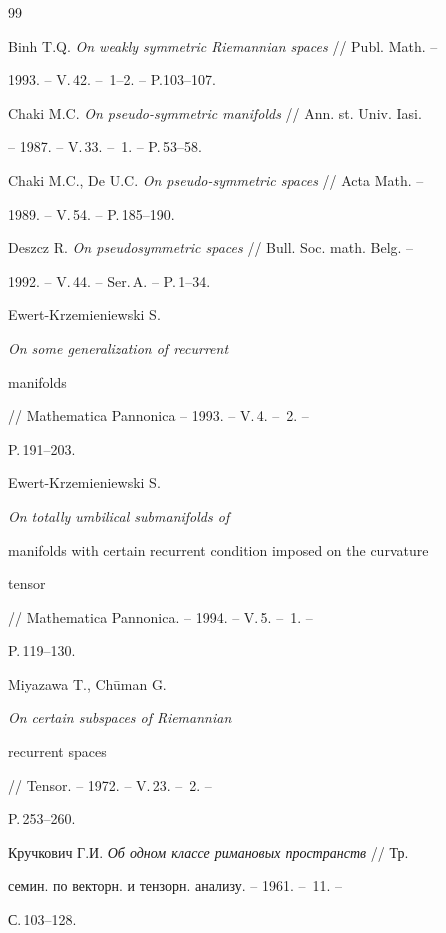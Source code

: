 \begin{thebibliography}{99}







Binh T.Q. {\em On weakly symmetric Riemannian spaces} // Publ. Math. --


1993. -- V.\,42. -- \No\,1--2. -- P.103--107.




Chaki M.C. {\em On pseudo-symmetric manifolds} // Ann. st. Univ. Iasi.


-- 1987. -- V.\,33. -- \No\,1. -- P.\,53--58.




Chaki M.C., De U.C. {\em On pseudo-symmetric spaces} // Acta Math. --


1989. -- V.\,54. -- P.\,185--190.




Deszcz R. {\em On pseudosymmetric spaces} // Bull. Soc. math. Belg. --


1992. -- V.\,44. -- Ser.\,A. -- P.\,1--34.




Ewert-Krzemieniewski S. {\em On some generalization of recurrent


manifolds} // Mathematica Pannonica -- 1993. -- V.\,4. -- \No\,2. --


P.\,191--203.




Ewert-Krzemieniewski S. {\em On totally umbilical submanifolds of


manifolds with certain recurrent condition imposed on the curvature


tensor} // Mathematica Pannonica. -- 1994. -- V.\,5. -- \No\,1. --


P.\,119--130.




Miyazawa T., Ch\=uman G. {\em On certain subspaces of Riemannian


recurrent spaces} // Tensor. -- 1972. -- V.\,23. -- \No\,2. --


P.\,253--260.




Кручкович Г.И. {\em Об одном классе римановых пространств} // Тр.


семин. по векторн. и тензорн. анализу. -- 1961. -- \No\,11. --


С.\,103--128.



\end{thebibliography}
